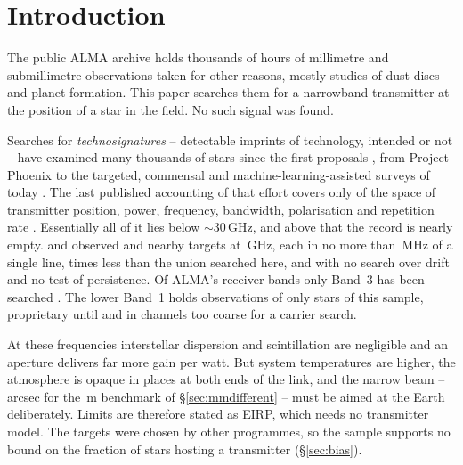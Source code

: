 \section{Introduction}
\label{sec:intro}

The public ALMA archive holds thousands of hours of millimetre and
submillimetre observations taken for other reasons, mostly studies of dust
discs and planet formation. This paper searches them for a narrowband
transmitter at the position of a star in the field. No such signal was found.

Searches for \emph{technosignatures} -- detectable imprints of technology,
intended or not \citep{Sheikh2020,SETIreview2025} -- have examined many
thousands of stars since the first proposals
\citep{CocconiMorrison1959,Drake1960}, from Project Phoenix
\citep{Tarter2001,Backus2002} to the targeted, commensal and
machine-learning-assisted surveys of today
\citep{Zhang2020,Czech2021,FAST3IATLAS2025,LOFARdualsite2023,Choza2024,Morrison2023,Tremblay2024,SRT2025,Ma2023,GLOBULAR2025,AnomalyParkesGBT2025}.
The last published accounting of that effort covers only \HaystackFrac{} of
the space of transmitter position, power, frequency, bandwidth, polarisation
and repetition rate \citep{Wright2018}. Essentially all of it lies below
${\sim}30$\,GHz, and above that the record is nearly empty.
\citet{Steffes1994} and \citet{Mauersberger1996} observed \SbPriorNStarA{} and
\SbPriorNStarB{} nearby targets at \SbPriorFreqGHz\,GHz, each in no more than
\SbPriorBandMHz\,MHz of a single line, \SbPriorRatio{} times less than the
union searched here, and with no search over drift and no test of
persistence. Of ALMA's receiver bands only Band~3 has been searched
\citep{Mason2025}. The lower Band~1 holds observations of only \SbBoneNStar{}
stars of this sample, proprietary until \SbBoneRelYear{} and in channels too
coarse for a carrier search.

At these frequencies interstellar dispersion and scintillation are negligible
and an aperture delivers far more gain per watt. But system temperatures are
higher, the atmosphere is opaque in places at both ends of the link, and the
narrow beam -- \BmArcsec{} arcsec for the \BenchDiam\,m benchmark of
\S\ref{sec:mmdifferent} -- must be aimed at the Earth deliberately. Limits are
therefore stated as EIRP, which needs no transmitter model. The targets were
chosen by other programmes, so the sample supports no bound on the fraction of
stars hosting a transmitter \citep{Wright2018,Margot2023,EarthDetectingEarth2025}
(\S\ref{sec:bias}).

